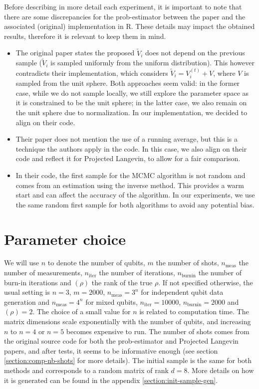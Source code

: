 \documentclass[12pt]{memoir}
\newcommand{\nmeasn}[1]{$n_{\text{meas}}=#1$}
\newcommand{\nitern}[1]{$n_{\text{iter}}=#1$}
\newcommand{\nburninn}[1]{$n_{\text{burnin}}=#1$}
\newcommand{\rhorankn}[1]{\text{rank}$(\rho)=#1$}
\newcommand{\nmeas}[0]{$n_{\text{meas}} $ }
\newcommand{\niter}[0]{$n_{\text{iter}} $ }
\newcommand{\nburnin}[0]{$n_{\text{burnin}} $ }
\newcommand{\rhorank}[0]{\text{rank}$(\rho) $ }
\begin{document}
Before describing in more detail each experiment, it is important to note that there are some discrepancies for the prob-estimator between the paper and the associated (original) implementation in R. These details may impact the obtained results, therefore it is relevant to keep them in mind.
\begin{itemize}
\item The original paper states the proposed $\tilde V_i$ does not depend on the previous sample ($\tilde V_i$ is sampled uniformly from the uniform distribution). This however contradicts their implementation, which considers $\tilde V_i = V_i^{(t)} + V$, where $V$ is sampled from the unit sphere. Both approaches seem valid: in the former case, while we do not sample locally, we still explore the parameter space as it is constrained to be the unit sphere; in the latter case, we also remain on the unit sphere due to normalization. In our implementation, we decided to align on their code.
\item Their paper does not mention the use of a running average, but this is a technique the authors apply in the code. In this case, we also align on their code and reflect it for Projected Langevin, to allow for a fair comparison.
\item In their code, the first sample for the MCMC algorithm is not random and comes from an estimation using the inverse method. This provides a warm start and can affect the accuracy of the algorithm. In our experiments, we use the same random first sample for both algorithms to avoid any potential bias. 
\end{itemize}


\section{Parameter choice}
We will use $n$ to denote the number of qubits, $m$ the number of shots, \nmeas the number of measurements, \niter the number of iterations, \nburnin the number of burn-in iterations and \rhorank the rank of the true $\rho$. If not specified otherwise, the usual setting is $n=3$, $m=2000$, \nmeasn{3^n} for independent qubit data generation and \nmeasn{4^n} for mixed qubits, \nitern{10000}, \nburninn{2000} and \rhorankn{2}. The choice of a small value for $n$ is related to computation time. The matrix dimensions scale exponentially with the number of qubits, and increasing $n$ to $n=4$ or $n=5$ becomes expensive to run. The number of shots comes from the original source code for both the prob-estimator and Projected Langevin papers, and after tests, it seems to be informative enough (see section \ref{section:comp-nb-shots} for more details). The initial sample is the same for both methods and corresponds to a random matrix of rank $d=8$. More details on how it is generated can be found in the appendix \ref{section:init-sample-gen}.\medbreak
\end{document}
